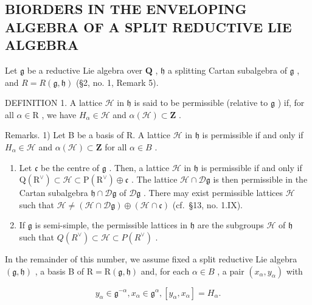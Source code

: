 \subsection{BIORDERS IN THE ENVELOPING ALGEBRA OF A SPLIT REDUCTIVE LIE ALGEBRA}

Let \(\mathfrak{g}\) be a reductive Lie algebra over \(\mathbf{Q}\) , \(\mathfrak{h}\) a splitting Cartan subalgebra of \(\mathfrak{g}\) , and \(R = R(\mathfrak{g},\mathfrak{h})\) (§2, no. 1, Remark 5).

DEFINITION 1. A lattice \(\mathcal{H}\) in \(\mathfrak{h}\) is said to be permissible (relative to \(\mathfrak{g}\) ) if, for all \(\alpha \in \mathrm{R}\) , we have \(H_{\alpha} \in \mathcal{H}\) and \(\alpha(\mathcal{H}) \subset \mathbf{Z}\) .

Remarks. 1) Let B be a basis of R. A lattice \(\mathcal{H}\) in \(\mathfrak{h}\) is permissible if and only if \(H_{\alpha} \in \mathcal{H}\) and \(\alpha(\mathcal{H}) \subset \mathbf{Z}\) for all \(\alpha \in B\) .

\begin{enumerate}
\def\labelenumi{\arabic{enumi})}
\setcounter{enumi}{1}
\item
  Let \(\mathfrak{c}\) be the centre of \(\mathfrak{g}\) . Then, a lattice \(\mathcal{H}\) in \(\mathfrak{h}\) is permissible if and only if \(\mathrm{Q}(\mathrm{R}^{\vee}) \subset \mathcal{H} \subset \mathrm{P}(\mathrm{R}^{\vee}) \oplus \mathfrak{c}\) . The lattice \(\mathcal{H} \cap \mathcal{D}\mathfrak{g}\) is then permissible in the Cartan subalgebra \(\mathfrak{h} \cap \mathcal{D}\mathfrak{g}\) of \(\mathcal{D}\mathfrak{g}\) . There may exist permissible lattices \(\mathcal{H}\) such that \(\mathcal{H} \neq (\mathcal{H} \cap \mathcal{D}\mathfrak{g}) \oplus (\mathcal{H} \cap \mathfrak{c})\) (cf.~§13, no. 1.IX).
\item
  If \(\mathfrak{g}\) is semi-simple, the permissible lattices in \(\mathfrak{h}\) are the subgroups \(\mathcal{H}\) of \(\mathfrak{h}\) such that \(Q(R^{\vee})\subset \mathcal{H}\subset P(R^{\vee})\) .
\end{enumerate}

In the remainder of this number, we assume fixed a split reductive Lie algebra \((\mathfrak{g},\mathfrak{h})\) , a basis B of \(\mathrm{R}=\mathrm{R}(\mathfrak{g},\mathfrak{h})\) and, for each \(\alpha\in B\) , a pair \((x_{\alpha},y_{\alpha})\) with

\[
y _ {\alpha} \in \mathfrak {g} ^ {- \alpha}, x _ {\alpha} \in \mathfrak {g} ^ {\alpha}, [ y _ {\alpha}, x _ {\alpha} ] = H _ {\alpha}.\tag{20}
\]

